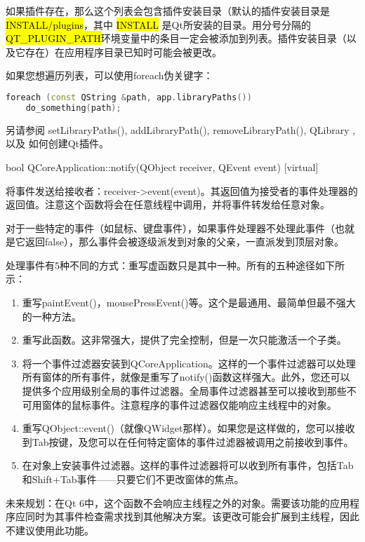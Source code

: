 如果插件存在，那么这个列表会包含插件安装目录（默认的插件安装目录是
\hl{INSTALL/plugins}，其中 \hl{INSTALL} 是Qt所安装的目录。用分号分隔的\hl{QT\_PLUGIN\_PATH}环境变量中的条目一定会被添加到列表。插件安装目录（以及它存在）在应用程序目录已知时可能会被更改。

如果您想遍历列表，可以使用foreach伪关键字：

\begin{lstlisting}[language=C++]
foreach (const QString &path, app.libraryPaths())
    do_something(path);
\end{lstlisting}

另请参阅 setLibraryPaths(), addLibraryPath(), removeLibraryPath(), QLibrary , 以及 如何创建Qt插件。

bool QCoreApplication::notify(QObject receiver, QEvent event) [virtual]

将事件发送给接收者：receiver->event(event)。其返回值为接受者的事件处理器的返回值。注意这个函数将会在任意线程中调用，并将事件转发给任意对象。

对于一些特定的事件（如鼠标、键盘事件），如果事件处理器不处理此事件（也就是它返回false），那么事件会被逐级派发到对象的父亲，一直派发到顶层对象。

处理事件有5种不同的方式：重写虚函数只是其中一种。所有的五种途径如下所
示：

\begin{enumerate}
\item 重写paintEvent()，mousePressEvent()等。这个是最通用、最简单但最不强大的一种方法。
\item 重写此函数。这非常强大，提供了完全控制，但是一次只能激活一个子类。
\item 将一个事件过滤器安装到QCoreApplication。这样的一个事件过滤器可以处理所有窗体的所有事件，就像是重写了notify()函数这样强大。此外，您还可以提供多个应用级别全局的事件过滤器。全局事件过滤器甚至可以接收到那些不可用窗体的鼠标事件。注意程序的事件过滤器仅能响应主线程中的对象。
\item 重写QObject::event()（就像QWidget那样）。如果您是这样做的，您可以接收到Tab按键，及您可以在任何特定窗体的事件过滤器被调用之前接收到事件。
\item 在对象上安装事件过滤器。这样的事件过滤器将可以收到所有事件，包括Tab和Shift+Tab事件——只要它们不更改窗体的焦点。
\end{enumerate}

未来规划：在Qt 6中，这个函数不会响应主线程之外的对象。需要该功能的应用程序应同时为其事件检查需求找到其他解决方案。该更改可能会扩展到主线程，因此不建议使用此功能。

